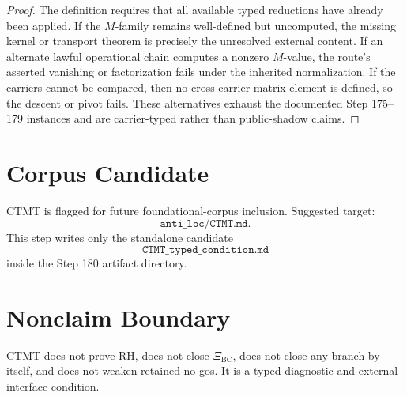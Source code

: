 \documentclass[11pt]{article}
\begin{document}
\begin{proof}
The definition requires that all available typed reductions have already been
applied.  If the \(M\)-family remains well-defined but uncomputed, the missing
kernel or transport theorem is precisely the unresolved external content.  If
an alternate lawful operational chain computes a nonzero \(M\)-value, the
route's asserted vanishing or factorization fails under the inherited
normalization.  If the carriers cannot be compared, then no cross-carrier
matrix element is defined, so the descent or pivot fails.  These alternatives
exhaust the documented Step 175--179 instances and are carrier-typed rather
than public-shadow claims.
\end{proof}

\section{Corpus Candidate}

CTMT is flagged for future foundational-corpus inclusion.  Suggested target:
\[
\texttt{anti\_loc/CTMT.md}.
\]
This step writes only the standalone candidate
\[
\texttt{CTMT\_typed\_condition.md}
\]
inside the Step 180 artifact directory.

\section{Nonclaim Boundary}

CTMT does not prove RH, does not close \(\Xi_{\mathrm{BC}}\), does not close
any branch by itself, and does not weaken retained no-gos.  It is a typed
diagnostic and external-interface condition.
\end{document}
